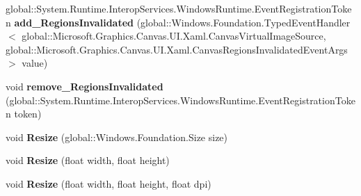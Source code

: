 \begin{DoxyCompactItemize}
\item 
\mbox{\label{interface_microsoft_1_1_graphics_1_1_canvas_1_1_u_i_1_1_xaml_1_1_i_canvas_virtual_image_source_ad46426bf1b7c4443b87a1e998db5c012}} 
global\+::\+System.\+Runtime.\+Interop\+Services.\+Windows\+Runtime.\+Event\+Registration\+Token {\bfseries add\+\_\+\+Regions\+Invalidated} (global\+::\+Windows.\+Foundation.\+Typed\+Event\+Handler$<$ global\+::\+Microsoft.\+Graphics.\+Canvas.\+U\+I.\+Xaml.\+Canvas\+Virtual\+Image\+Source, global\+::\+Microsoft.\+Graphics.\+Canvas.\+U\+I.\+Xaml.\+Canvas\+Regions\+Invalidated\+Event\+Args $>$ value)
\item 
\mbox{\label{interface_microsoft_1_1_graphics_1_1_canvas_1_1_u_i_1_1_xaml_1_1_i_canvas_virtual_image_source_a46e07a464bbb440ccaf5550dea1da55f}} 
void {\bfseries remove\+\_\+\+Regions\+Invalidated} (global\+::\+System.\+Runtime.\+Interop\+Services.\+Windows\+Runtime.\+Event\+Registration\+Token token)
\item 
\mbox{\label{interface_microsoft_1_1_graphics_1_1_canvas_1_1_u_i_1_1_xaml_1_1_i_canvas_virtual_image_source_a09dcc1df360a28aaed847abfaa318e7f}} 
void {\bfseries Resize} (global\+::\+Windows.\+Foundation.\+Size size)
\item 
\mbox{\label{interface_microsoft_1_1_graphics_1_1_canvas_1_1_u_i_1_1_xaml_1_1_i_canvas_virtual_image_source_aeae2edb4ee318d5c8112d6d80769828d}} 
void {\bfseries Resize} (float width, float height)
\item 
\mbox{\label{interface_microsoft_1_1_graphics_1_1_canvas_1_1_u_i_1_1_xaml_1_1_i_canvas_virtual_image_source_a933630828281e36bfca92b99181d4c1b}} 
void {\bfseries Resize} (float width, float height, float dpi)
\item 
\mbox{\label{interface_microsoft_1_1_graphics_1_1_canvas_1_1_u_i_1_1_xaml_1_1_i_canvas_virtual_image_source_a0e5a4410e5ef0de72311321fa79114b7}} 

\end{DoxyCompactItemize}
